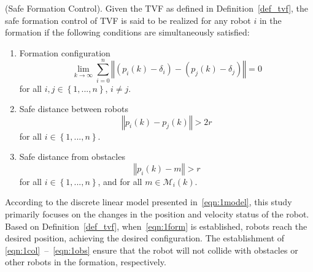 \begin{definition}\label{def_pro}
(Safe Formation Control). Given the TVF as defined in Definition~\ref{def_tvf}, the safe formation control of TVF is said to be realized for any robot $i$ in the formation if the following conditions are simultaneously satisfied:
\begin{enumerate}
    \item Formation configuration
\begin{equation}
    \lim_{k\to\infty}\sum_{i=0}^n{\left\Vert\left(p_i(k)-\delta_i\right) - \left(p_j(k)-\delta_{j}\right)\right\Vert}=0
    \label{eqn:1form}
\end{equation}
for all $i,j\in\left\{1,...,n\right\}$, $i\neq j$.
    \item Safe distance between robots
\begin{equation}
    \left\Vert p_i(k)-p_j(k)\right\Vert > 2r
    \label{eqn:1col}
\end{equation}
for all $i\in\left\{1,...,n\right\}$.
    \item Safe distance from obstacles
\begin{equation}
    \left\Vert p_i(k)-m\right\Vert > r
    \label{eqn:1obs}
\end{equation}
for all $i\in\left\{1,...,n\right\}$, and for all $m\in\mathcal{M}_i(k)$. 
\end{enumerate}
\end{definition}

\begin{remark}
According to the discrete linear model presented in~\eqref{eqn:1model}, this study primarily focuses on the changes in the position and velocity status of the robot. Based on Definition~\ref{def_tvf}, when~\eqref{eqn:1form} is established, robots reach the desired position, achieving the desired configuration. 
The establishment of \eqref{eqn:1col}~--~\eqref{eqn:1obs} ensure that the robot will not collide with obstacles or other robots in the formation, respectively.
\end{remark}

